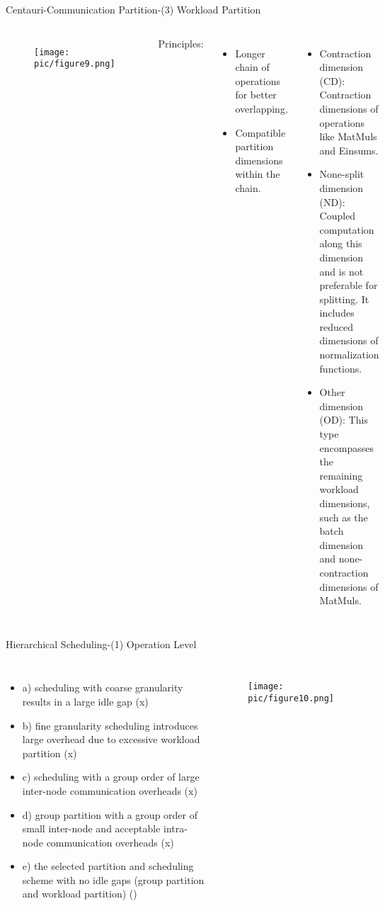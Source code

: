 \documentclass{beamer}
\begin{document}
\begin{frame}{Centauri-Communication Partition-(3) Workload Partition}
\begin{columns}
\begin{figure}
	\centering
		\texttt{[image: pic/figure9.png]}
		\label{secert_sharing_figures}
\end{figure}%
Principles:
\begin{itemize}
\scriptsize
		\item {Longer chain of operations for better overlapping.}
        \item {Compatible partition dimensions within the chain.}
\end{itemize}
   
   \begin{itemize}
   \scriptsize
       \item Contraction dimension (CD): Contraction dimensions of operations like MatMuls and Einsums.
       \item None-split dimension (ND): Coupled computation along this dimension and is not preferable for splitting. It includes reduced dimensions of normalization functions.
       \item Other dimension (OD): This type encompasses the remaining workload dimensions, such as the batch dimension and none-contraction dimensions of MatMuls.
   \end{itemize}
\end{columns}
\end{frame}

\begin{frame}{Hierarchical Scheduling-(1) Operation Level}
	\begin{columns}
		\scriptsize
		\begin{itemize}
			\item a) scheduling with coarse granularity results in a large idle gap (x)
			\item b) fine granularity scheduling introduces large overhead due to excessive workload partition (x)
			\item c) scheduling with a group order of large inter-node communication overheads (x)
			\item d) group partition with a group order of small inter-node and acceptable intra-node communication overheads (x)
			\item e) the selected partition and scheduling scheme with no idle gaps (group partition and workload partition) (\checkmark)
		\end{itemize}%
		\begin{figure}
			\centering
			\texttt{[image: pic/figure10.png]}
		\end{figure}
		
	\end{columns}
\end{frame}
\end{document}
